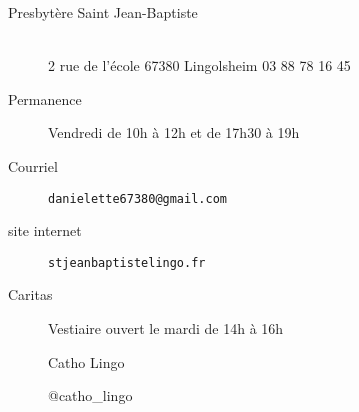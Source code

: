 \begin{framed}
\begin{description}
\item[Presbytère Saint Jean-Baptiste]
~\\
2 rue de l'école 67380 Lingolsheim 03 88 78 16 45
\item[Permanence] Vendredi de 10h à 12h et de 17h30 à 19h
\item[Courriel] \texttt{danielette67380@gmail.com}
\item[site internet] \texttt{stjeanbaptistelingo.fr}
\item[Caritas] Vestiaire ouvert le mardi de 14h à 16h
\item[\faFacebook] Catho Lingo
\item[\faInstagram] @catho\_lingo
\end{description}
\end{framed}

